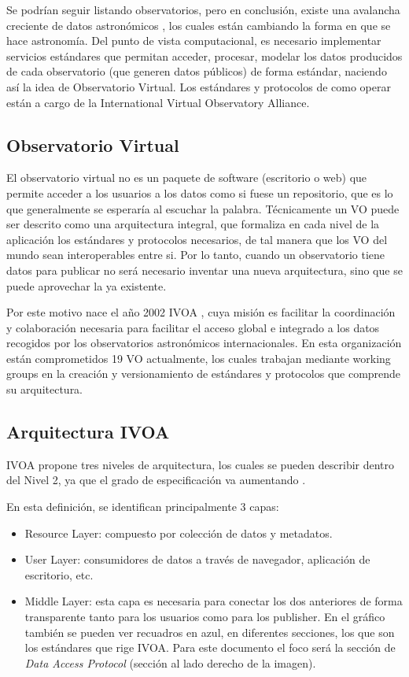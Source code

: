 Se podrían seguir listando observatorios, pero en conclusión, existe una
avalancha creciente de datos astronómicos \cite{kborne}, los cuales están cambiando la forma
en que se hace astronomía. Del punto de vista computacional, es necesario
implementar servicios estándares que permitan acceder, procesar, modelar los
datos producidos de cada observatorio (que generen datos públicos) de forma
estándar, naciendo así la idea de Observatorio Virtual. Los estándares y
protocolos de como operar están a cargo de la International Virtual Observatory
Alliance. 

\subsection{Observatorio Virtual}
El observatorio virtual no es un paquete de software (escritorio o web) que
permite acceder a los usuarios a los datos como si fuese un repositorio, que es
lo que generalmente se esperaría al escuchar la palabra. Técnicamente un VO
puede ser descrito como una arquitectura integral, que formaliza en cada
nivel de la aplicación los estándares y protocolos necesarios, de tal manera
que los VO del mundo sean interoperables entre si. Por lo tanto, cuando un
observatorio tiene datos para publicar no será necesario inventar una nueva
arquitectura, sino que se puede aprovechar la ya existente.

Por este motivo nace el año 2002 IVOA \cite{ivoa}, cuya misión es facilitar
la coordinación y colaboración necesaria para facilitar el acceso global e
integrado a los datos recogidos por los observatorios astronómicos
internacionales. En esta organización están comprometidos 19 VO actualmente,
los cuales trabajan mediante working groups en la creación y versionamiento de
estándares y protocolos que comprende su arquitectura.

\subsection{Arquitectura IVOA}

IVOA propone tres niveles de arquitectura, los cuales se pueden describir
dentro del Nivel 2, ya que el grado de especificación va aumentando \cite{arch}.

En esta definición, se identifican principalmente 3 capas:
\begin{itemize}
	\item Resource Layer: compuesto por colección de datos y metadatos.
	\item User Layer: consumidores de datos a través de navegador,
aplicación de escritorio, etc.
	\item Middle Layer: esta capa es necesaria para conectar los dos
anteriores de forma transparente tanto para los usuarios como para los
publisher. En el gráfico también se pueden ver recuadros en azul, en diferentes
secciones, los que son los estándares que rige IVOA. Para este documento el
foco será la sección de \emph{Data Access Protocol} (sección al lado derecho de
la imagen).
\end{itemize}

